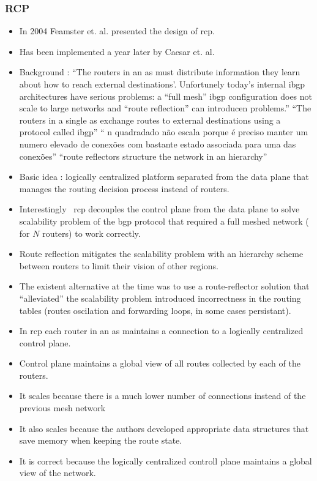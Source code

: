 \subsubsection{RCP}
\begin{itemize}
\item  In 2004 Feamster et. al.  \cite{Feamster:2004tg}   presented the design of \gls{rcp}.
\item  Has been implemented a year later by Caesar et. al.  \cite{Caesar:2005wsa}

\item Background : ``The routers in an \gls{as} must distribute information they learn about how to reach external destinations'. Unfortunely today's internal \gls{ibgp} architectures have serious problems: a ``full mesh'' \gls{ibgp} configuration does not scale to large networks and ``route reflection'' can introducen problems.'' ``The routers in a single \gls{as} exchange routes to external destinations using a protocol called \gls{ibgp}'' `` n quadradado não escala porque é preciso manter um numero elevado de conexões com bastante estado associada para uma das conexões'' ``route reflectors structure the network in an hierarchy''

\item Basic idea : logically centralized platform separated from the data plane that manages the routing decision process instead of routers. 
\item Interestingly ~\gls{rcp} decouples the control plane from the data plane to solve scalability problem of the \gls{bgp} protocol that required a full meshed network ( for $N$ routers)   to work correctly. 
\item Route reflection mitigates the scalability problem  with an hierarchy scheme between routers to limit their vision of other regions. 

\item The existent alternative at the time was to use a route-reflector solution that ``alleviated'' the  scalability problem introduced incorrectness in the routing tables (routes oscilation and forwarding loops, in some cases persistant). 

\item In \gls{rcp} each router in an \gls{as}  maintains a connection to a logically centralized control plane. 
\item Control plane maintains a global view of all routes collected by each of the routers.
\item It scales because there is a much lower number of connections instead of the previous mesh network
\item It also scales because the authors developed appropriate data structures that save memory when keeping the route state. 
\item It is correct because the logically centralized controll plane maintains a global view of the network.



\end{itemize}
